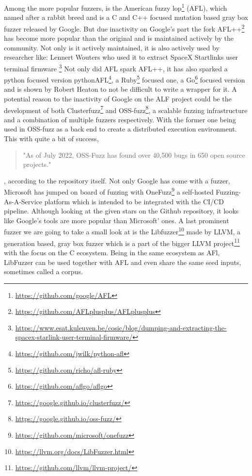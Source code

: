 Among the more popular fuzzers, is the American fuzzy lop\footnote{\url{https://github.com/google/AFL}} (AFL), which named after a rabbit breed and is a C and C++ focused mutation based gray box fuzzer released by Google. But due inactivity on Google's part the fork AFL++\footnote{\url{https://github.com/AFLplusplus/AFLplusplus}} has become more popular than the original and is maintained actively by the community\cite{27AFL++}. Not only is it actively maintained, it is also actively used by researcher like: Lennert Wouters who used it to extract SpaceX Startlinks user terminal firmware \footnote{\url{https://www.esat.kuleuven.be/cosic/blog/dumping-and-extracting-the-spacex-starlink-user-terminal-firmware/}} 
Not only did AFL spark AFL++, it has also sparked a python focused version pythonAFL\footnote{\url{https://github.com/jwilk/python-afl}}, a Ruby\footnote{\url{https://github.com/richo/afl-ruby}} focused one, a Go\footnote{\url{https://github.com/aflgo/aflgo}} focused version and is shown by Robert Heaton\cite{AFLWrapper} to not be difficult to write a wrapper for it. A potential reason to the inactivity of Google on the ALF project could be the development of both Clusterfuzz\footnote{\url{https://google.github.io/clusterfuzz/}} and OSS-fuzz\footnote{\url{https://google.github.io/oss-fuzz/}}, a scalable fuzzing infrastructure and a combination of multiple fuzzers respectively. With the former one being used in OSS-fuzz as a back end to create a distributed execution environment. This with quite a bit of success\cite{31OSS-FuzzBugs},
\begin{quote} 
	"As of July 2022, OSS-Fuzz has found over 40,500 bugs in 650 open source projects."
\end{quote}, according to the repository itself. 
Not only Google has come with a fuzzer, Microsoft has jumped on board of fuzzing with OneFuzz\footnote{\url{https://github.com/microsoft/onefuzz}} a self-hosted Fuzzing-As-A-Service platform which is intended to be integrated with the CI/CD pipeline. Although looking at the given stars on the Github repository, it looks like Google's tools are more popular than Microsoft' ones.
A last prominent fuzzer we are going to take a small look at is the Libfuzzer\footnote{\url{https://llvm.org/docs/LibFuzzer.html}} made by LLVM, a generation based, gray box fuzzer which is a part of the bigger LLVM project\footnote{\url{https://github.com/llvm/llvm-project/}} with the focus on the C ecosystem. Being in the same ecosystem as AFl, LibFuzzer can be used together with AFL and even share the same seed inputs, sometimes called a corpus.


